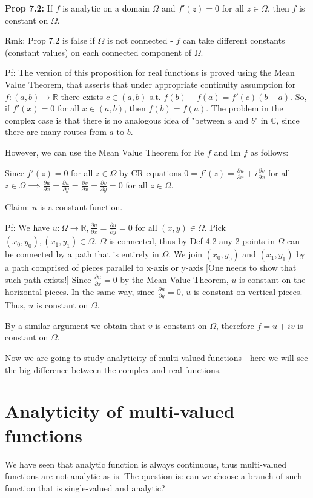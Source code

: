 \documentclass{article}
\begin{document}
\textbf{Prop 7.2:} If $f$ is analytic on a domain $\Omega$ and $f'(z) = 0$ for all $z \in \Omega$, then $f$ is constant on $\Omega$.

Rmk: Prop 7.2 is false if $\Omega$ is not connected - $f$ can take different constants (constant values) on each connected component of $\Omega$.

Pf: The version of this proposition for real functions is proved using the Mean Value Theorem, that asserts that under appropriate continuity assumption for $f: (a,b) \to \mathbb{R}$ there exists $c \in (a,b)$ s.t. $f(b) - f(a) = f'(c)(b-a)$. So, if $f'(x) = 0$ for all $x \in (a,b)$, then $f(b) = f(a)$. The problem in the complex case is that there is no analogous idea of "between $a$ and $b$" in $\mathbb{C}$, since there are many routes from $a$ to $b$.

However, we can use the Mean Value Theorem for Re $f$ and Im $f$ as follows:

Since $f'(z) = 0$ for all $z \in \Omega$ by CR equations $0 = f'(z) = \frac{\partial u}{\partial x} + i\frac{\partial v}{\partial x}$ for all $z \in \Omega \implies \frac{\partial u}{\partial x} = \frac{\partial u}{\partial y} = \frac{\partial v}{\partial x} = \frac{\partial v}{\partial y} = 0$ for all $z \in \Omega$.

Claim: $u$ is a constant function.

Pf: We have $u: \Omega \to \mathbb{R}, \frac{\partial u}{\partial x} = \frac{\partial u}{\partial y} = 0$ for all $(x,y) \in \Omega$. Pick $(x_0, y_0), (x_1, y_1) \in \Omega$. $\Omega$ is connected, thus by Def 4.2 any 2 points in $\Omega$ can be connected by a path that is entirely in $\Omega$. We join $(x_0, y_0)$ and $(x_1, y_1)$ by a path comprised of pieces parallel to x-axis or y-axis [One needs to show that such path exists!] Since $\frac{\partial u}{\partial x} = 0$ by the Mean Value Theorem, $u$ is constant on the horizontal pieces. In the same way,
since $\frac{\partial u}{\partial y} = 0$, $u$ is constant on vertical pieces. Thus, $u$ is constant on $\Omega$.

By a similar argument we obtain that $v$ is constant on $\Omega$, therefore $f = u + iv$ is constant on $\Omega$.

Now we are going to study analyticity of multi-valued functions - here we will see the big difference between the complex and real functions.

\section{Analyticity of multi-valued functions}
We have seen that analytic function is always continuous, thus multi-valued functions are not analytic as is. The question is: can we choose a branch of such function that is single-valued and analytic?
\end{document}
